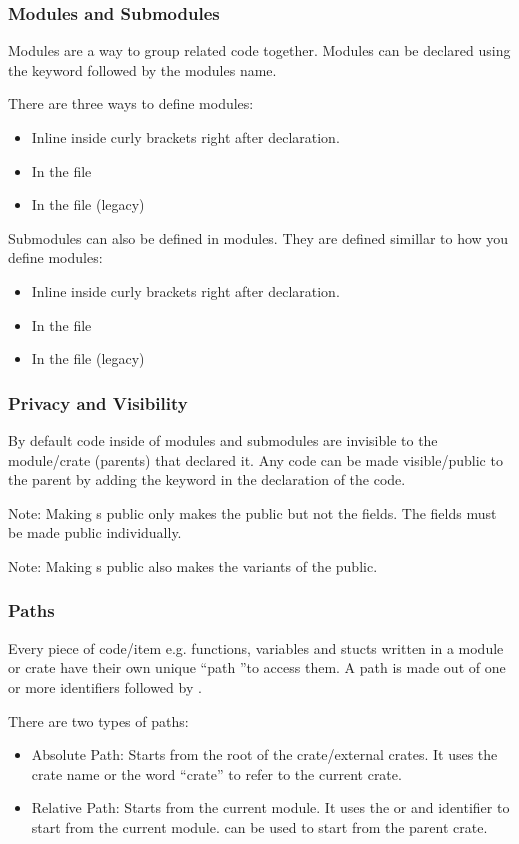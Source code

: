 \documentclass{beamer}
\begin{document}
\begin{frame}
  \frametitle{Modules and Submodules}
  Modules are a way to group related code together. Modules can be declared using the  keyword followed by the modules name.

  There are three ways to define modules:
  \begin{itemize}
    \item Inline inside curly brackets right after declaration.
    \item In the file 
    \item In the file  (legacy)
  \end{itemize}

  Submodules can also be defined in modules. They are defined simillar to how you define modules:
  \begin{itemize}
    \item Inline inside curly brackets right after declaration.
    \item In the file 
    \item In the file  (legacy)
  \end{itemize}
\end{frame}

\begin{frame}
  \frametitle{Privacy and Visibility}
  By default code inside of modules and submodules are invisible to the module/crate (parents) that declared it. Any code can be made visible/public to the parent by adding the  keyword in the declaration of the code.

  

  \alert{Note}: Making s public only makes the  public but not the fields. The fields must be made public individually.

  \alert{Note}: Making s public also makes the variants of the  public.
\end{frame}

\begin{frame}
  \frametitle{Paths}
  Every piece of code/item e.g. functions, variables and stucts written in a module or crate have their own unique ``path ''to access them.
  A path is made out of one or more identifiers followed by \inlinecode{::}.

  There are two types of paths:
  \begin{itemize}
    \item{Absolute Path: Starts from the root of the crate/external crates. It uses the crate name or the word ``crate'' to refer to the current crate.}
    \item{Relative Path: Starts from the current module. It uses the  or and identifier to start from the current module.  can be used to start from the parent crate.}
  \end{itemize}
\end{frame}
\end{document}
